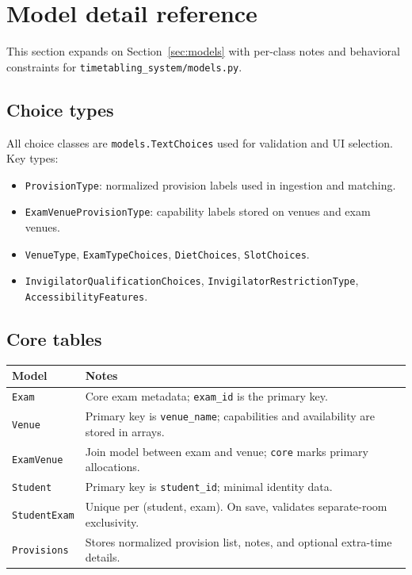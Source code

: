 \section{Model detail reference}
\label{sec:models:detail}

This section expands on Section~\ref{sec:models} with per-class notes and behavioral constraints for \texttt{timetabling\_system/models.py}.

\subsection{Choice types}
\label{subsec:models:detail:choices}

All choice classes are \texttt{models.TextChoices} used for validation and UI selection. Key types:

\begin{itemize}
  \item \texttt{ProvisionType}: normalized provision labels used in ingestion and matching.
  \item \texttt{ExamVenueProvisionType}: capability labels stored on venues and exam venues.
  \item \texttt{VenueType}, \texttt{ExamTypeChoices}, \texttt{DietChoices}, \texttt{SlotChoices}.
  \item \texttt{InvigilatorQualificationChoices}, \texttt{InvigilatorRestrictionType}, \texttt{AccessibilityFeatures}.
\end{itemize}

\subsection{Core tables}
\label{subsec:models:detail:core}

\begin{longtable}{p{}p{}}
\toprule
\textbf{Model} & \textbf{Notes} \\
\midrule
\texttt{Exam} & Core exam metadata; \texttt{exam\_id} is the primary key. \\
\texttt{Venue} & Primary key is \texttt{venue\_name}; capabilities and availability are stored in arrays. \\
\texttt{ExamVenue} & Join model between exam and venue; \texttt{core} marks primary allocations. \\
\texttt{Student} & Primary key is \texttt{student\_id}; minimal identity data. \\
\texttt{StudentExam} & Unique per (student, exam). On save, validates separate-room exclusivity. \\
\texttt{Provisions} & Stores normalized provision list, notes, and optional extra-time details. \\
\bottomrule
\end{longtable}


